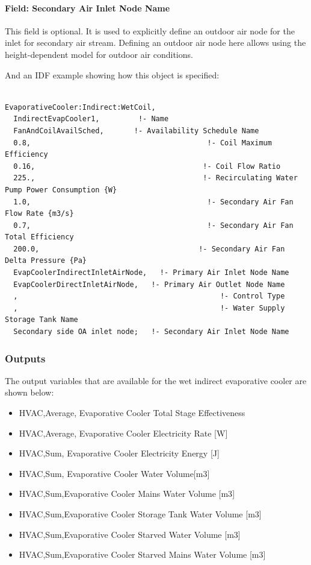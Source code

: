\paragraph{Field: Secondary Air Inlet Node Name}\label{field-secondary-air-inlet-node-name-1-000}

This field is optional. It is used to explicitly define an outdoor air node for the inlet for secondary air stream. Defining an outdoor air node here allows using the height-dependent model for outdoor air conditions.

And an IDF example showing how this object is specified:

\begin{lstlisting}

EvaporativeCooler:Indirect:WetCoil,
  IndirectEvapCooler1,         !- Name
  FanAndCoilAvailSched,       !- Availability Schedule Name
  0.8,                                         !- Coil Maximum Efficiency
  0.16,                                       !- Coil Flow Ratio
  225.,                                       !- Recirculating Water Pump Power Consumption {W}
  1.0,                                         !- Secondary Air Fan Flow Rate {m3/s}
  0.7,                                         !- Secondary Air Fan Total Efficiency
  200.0,                                     !- Secondary Air Fan Delta Pressure {Pa}
  EvapCoolerIndirectInletAirNode,   !- Primary Air Inlet Node Name
  EvapCoolerDirectInletAirNode,   !- Primary Air Outlet Node Name
  ,                                               !- Control Type
  ,                                               !- Water Supply Storage Tank Name
  Secondary side OA inlet node;   !- Secondary Air Inlet Node Name
\end{lstlisting}

\subsubsection{Outputs}\label{outputs-3-006}

The output variables that are available for the wet indirect evaporative cooler are shown below:

\begin{itemize}
\item
  HVAC,Average, Evaporative Cooler Total Stage Effectiveness
\item
  HVAC,Average, Evaporative Cooler Electricity Rate {[}W{]}
\item
  HVAC,Sum, Evaporative Cooler Electricity Energy {[}J{]}
\item
  HVAC,Sum, Evaporative Cooler Water Volume{[}m3{]}
\item
  HVAC,Sum,Evaporative Cooler Mains Water Volume {[}m3{]}
\item
  HVAC,Sum,Evaporative Cooler Storage Tank Water Volume {[}m3{]}
\item
  HVAC,Sum,Evaporative Cooler Starved Water Volume {[}m3{]}
\item
  HVAC,Sum,Evaporative Cooler Starved Mains Water Volume {[}m3{]}
\end{itemize}

